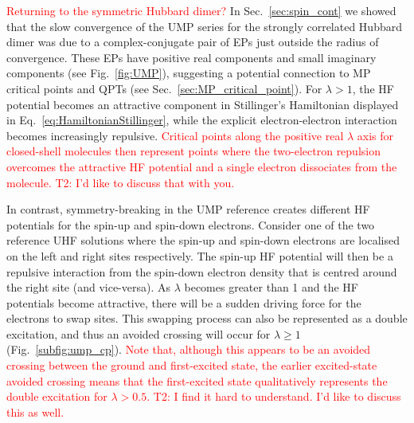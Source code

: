 \documentclass[aps,prb,reprint,noshowkeys,superscriptaddress]{revtex4-1}
\newcommand{\titou}[1]{\textcolor{red}{#1}}
\begin{document}
\titou{Returning to the symmetric Hubbard dimer?}
In Sec.~\ref{sec:spin_cont} we showed that the slow convergence of the UMP series for the strongly correlated
Hubbard dimer was due to a complex-conjugate pair of EPs just outside the radius of convergence.
These EPs have positive real components and small imaginary components (see Fig.~\ref{fig:UMP}), suggesting a potential 
connection to MP critical points and QPTs (see Sec.~\ref{sec:MP_critical_point}).
For $\lambda>1$, the HF potential becomes an attractive component in Stillinger's 
Hamiltonian displayed in Eq.~\eqref{eq:HamiltonianStillinger}, while the explicit electron-electron interaction
becomes increasingly repulsive.
\titou{Critical points along the positive real $\lambda$ axis for closed-shell molecules then represent 
points where the two-electron repulsion overcomes the attractive HF potential 
and a single electron dissociates from the molecule.\cite{Sergeev_2006}}
\titou{T2: I'd like to discuss that with you.}

In contrast, symmetry-breaking in the UMP reference creates different HF potentials for the spin-up and spin-down electrons.
Consider one of the two reference UHF solutions where the spin-up and spin-down electrons are localised on the left and right sites respectively. 
The spin-up HF potential will then be a repulsive interaction from the spin-down electron 
density that is centred around the right site (and vice-versa).
As $\lambda$ becomes greater than 1 and the HF potentials become attractive, there will be a sudden
driving force for the electrons to swap sites.
This swapping process can also be represented as a double excitation, and thus an avoided crossing will occur
for $\lambda \geq 1$ (Fig.~\ref{subfig:ump_cp}).
\titou{Note that, although this appears to be an avoided crossing between the ground and first-excited state, 
the earlier excited-state avoided crossing means that the first-excited state qualitatively 
represents the double excitation for $\lambda > 0.5.$}
\titou{T2: I find it hard to understand. I'd like to discuss this as well.}
\end{document}
